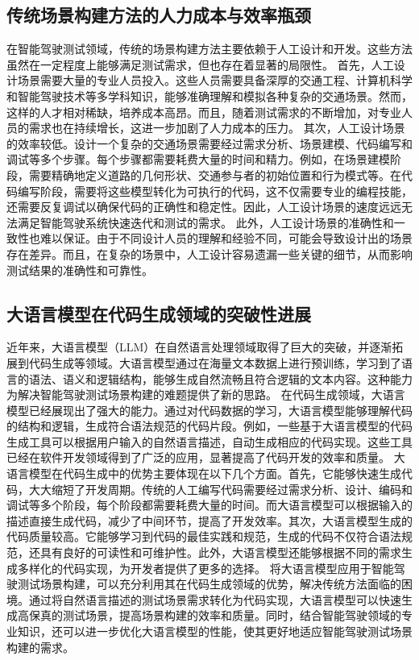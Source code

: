 \subsection{传统场景构建方法的人力成本与效率瓶颈}
在智能驾驶测试领域，传统的场景构建方法主要依赖于人工设计和开发。这些方法虽然在一定程度上能够满足测试需求，但也存在着显著的局限性。
首先，人工设计场景需要大量的专业人员投入。这些人员需要具备深厚的交通工程、计算机科学和智能驾驶技术等多学科知识，能够准确理解和模拟各种复杂的交通场景。然而，这样的人才相对稀缺，培养成本高昂。而且，随着测试需求的不断增加，对专业人员的需求也在持续增长，这进一步加剧了人力成本的压力。
其次，人工设计场景的效率较低。设计一个复杂的交通场景需要经过需求分析、场景建模、代码编写和调试等多个步骤。每个步骤都需要耗费大量的时间和精力。例如，在场景建模阶段，需要精确地定义道路的几何形状、交通参与者的初始位置和行为模式等。在代码编写阶段，需要将这些模型转化为可执行的代码，这不仅需要专业的编程技能，还需要反复调试以确保代码的正确性和稳定性。因此，人工设计场景的速度远远无法满足智能驾驶系统快速迭代和测试的需求。
此外，人工设计场景的准确性和一致性也难以保证。由于不同设计人员的理解和经验不同，可能会导致设计出的场景存在差异。而且，在复杂的场景中，人工设计容易遗漏一些关键的细节，从而影响测试结果的准确性和可靠性。

\subsection{大语言模型在代码生成领域的突破性进展}
近年来，大语言模型（LLM）在自然语言处理领域取得了巨大的突破，并逐渐拓展到代码生成等领域。大语言模型通过在海量文本数据上进行预训练，学习到了语言的语法、语义和逻辑结构，能够生成自然流畅且符合逻辑的文本内容。这种能力为解决智能驾驶测试场景构建的难题提供了新的思路。
在代码生成领域，大语言模型已经展现出了强大的能力。通过对代码数据的学习，大语言模型能够理解代码的结构和逻辑，生成符合语法规范的代码片段。例如，一些基于大语言模型的代码生成工具可以根据用户输入的自然语言描述，自动生成相应的代码实现。这些工具已经在软件开发领域得到了广泛的应用，显著提高了代码开发的效率和质量。
大语言模型在代码生成中的优势主要体现在以下几个方面。首先，它能够快速生成代码，大大缩短了开发周期。传统的人工编写代码需要经过需求分析、设计、编码和调试等多个阶段，每个阶段都需要耗费大量的时间。而大语言模型可以根据输入的描述直接生成代码，减少了中间环节，提高了开发效率。其次，大语言模型生成的代码质量较高。它能够学习到代码的最佳实践和规范，生成的代码不仅符合语法规范，还具有良好的可读性和可维护性。此外，大语言模型还能够根据不同的需求生成多样化的代码实现，为开发者提供了更多的选择。
将大语言模型应用于智能驾驶测试场景构建，可以充分利用其在代码生成领域的优势，解决传统方法面临的困境。通过将自然语言描述的测试场景需求转化为代码实现，大语言模型可以快速生成高保真的测试场景，提高场景构建的效率和质量。同时，结合智能驾驶领域的专业知识，还可以进一步优化大语言模型的性能，使其更好地适应智能驾驶测试场景构建的需求。



